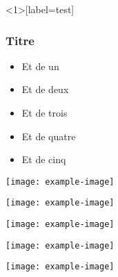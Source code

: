 \documentclass{beamer}
\begin{document}
\begin{frame}<1>[label=test]
     \frametitle{Titre}
\begin{itemize}[<+->]
     \item Et de un
     \item Et de deux
     \item Et de trois
     \item Et de quatre
     \item Et de cinq
\end{itemize}
\end{frame}

\begin{frame}
\texttt{[image: example-image]}
\end{frame}


\begin{frame}
\texttt{[image: example-image]}
\end{frame}


\begin{frame}
\texttt{[image: example-image]}
\end{frame}

\begin{frame}
\texttt{[image: example-image]}
\end{frame}


\begin{frame}
\texttt{[image: example-image]}
\end{frame}
\end{document}
